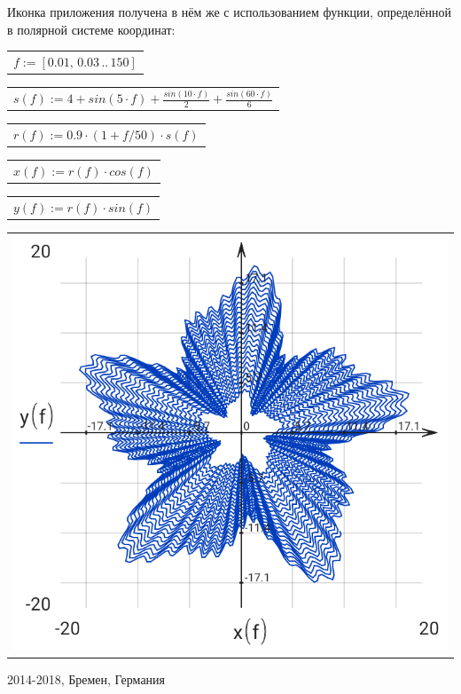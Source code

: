 \documentclass[DIV=calc, paper=a4, fontsize=11pt, twocolumn]{scrartcl}
\begin{document}
Иконка приложения получена в нём же
с использованием функции,
определённой в полярной системе
координат:
\begin{center}\begin{tabular}{c}
  $f := \left[ 0.01,\, 0.03 \,..\, 150 \right]$
\end{tabular}\end{center}
\begin{center}\begin{tabular}{c}
  $s(f) := 4 + sin \left( 5 \cdot f\right)  + \frac{sin \left( 10 \cdot f\right) }{2} + \frac{sin \left( 60 \cdot f\right) }{6}$
\end{tabular}\end{center}
\begin{center}\begin{tabular}{c}
  $r(f) := 0.9 \cdot \left( 1 + f / 50 \right) \cdot s \left( f\right) $
\end{tabular}\end{center}
\begin{center}\begin{tabular}{c}
  $x(f) := r \left( f\right)  \cdot cos \left( f\right) $
\end{tabular}\end{center}
\begin{center}\begin{tabular}{c}
  $y(f) := r \left( f\right)  \cdot sin \left( f\right) $
\end{tabular}\end{center}
\begin{center}\begin{tabular}{c} \includegraphics[resolution=320]{graphics/about_micromath_fig1.png} \end{tabular}\end{center}

2014-2018, Бремен, Германия
\end{document}
